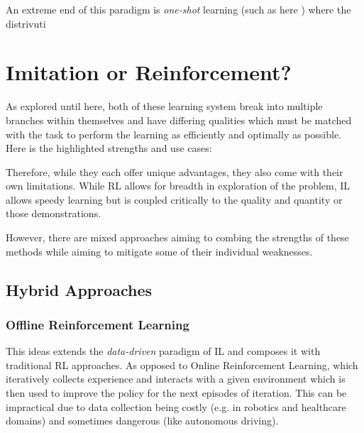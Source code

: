 An extreme end of this paradigm is \emph{one-shot} learning (such as here \cite{vitiello2023one}) where the distrivuti

\section{Imitation or Reinforcement?}
As explored until here, both of these learning system break into multiple branches within themselves and have differing qualities which must be matched with the task to perform the learning as efficiently and optimally as possible. Here is the highlighted strengths and use cases:


Therefore, while they each offer unique advantages, they also come with their own limitations. While RL allows for breadth in exploration of the problem, IL allows speedy learning but is coupled critically to the quality and quantity or those demonstrations. 

However, there are mixed approaches aiming to combing the strengths of these methods while aiming to mitigate some of their individual weaknesses.

\subsection{Hybrid Approaches}


\subsubsection{Offline Reinforcement Learning}
This ideas extends the \emph{data-driven} paradigm of IL and composes it with traditional RL approaches. As opposed to Online Reinforcement Learning, which iteratively collects experience and interacts with a given environment which is then used to improve the policy for the next episodes of iteration. This can be impractical due to data collection being costly (e.g. in robotics and healthcare domains) and sometimes dangerous (like autonomous driving). 

